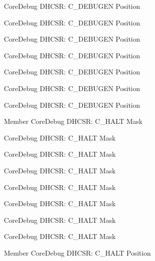 \begin{DoxyRefList}
\label{deprecated__deprecated000592}%
%
Core\+Debug DHCSR\+: C\+\_\+\+DEBUGEN Position 

\label{deprecated__deprecated000127}%
%
Core\+Debug DHCSR\+: C\+\_\+\+DEBUGEN Position 

\label{deprecated__deprecated000490}%
%
Core\+Debug DHCSR\+: C\+\_\+\+DEBUGEN Position 

\label{deprecated__deprecated000039}%
%
Core\+Debug DHCSR\+: C\+\_\+\+DEBUGEN Position 

\label{deprecated__deprecated000183}%
%
Core\+Debug DHCSR\+: C\+\_\+\+DEBUGEN Position 

\label{deprecated__deprecated000266}%
%
Core\+Debug DHCSR\+: C\+\_\+\+DEBUGEN Position 

\label{deprecated__deprecated000401}%
%
Core\+Debug DHCSR\+: C\+\_\+\+DEBUGEN Position  
\item[Member \doxylink{group__CMSIS__CoreDebug_ga1d905a3aa594eb2e8bb78bcc4da05b3f}{Core\+Debug\+\_\+\+DHCSR\+\_\+\+C\+\_\+\+HALT\+\_\+\+Msk} ]\label{deprecated__deprecated000265}%
%
Core\+Debug DHCSR\+: C\+\_\+\+HALT Mask 

\label{deprecated__deprecated000400}%
%
Core\+Debug DHCSR\+: C\+\_\+\+HALT Mask 

\label{deprecated__deprecated000324}%
%
Core\+Debug DHCSR\+: C\+\_\+\+HALT Mask 

\label{deprecated__deprecated000489}%
%
Core\+Debug DHCSR\+: C\+\_\+\+HALT Mask 

\label{deprecated__deprecated000182}%
%
Core\+Debug DHCSR\+: C\+\_\+\+HALT Mask 

\label{deprecated__deprecated000126}%
%
Core\+Debug DHCSR\+: C\+\_\+\+HALT Mask 

\label{deprecated__deprecated000038}%
%
Core\+Debug DHCSR\+: C\+\_\+\+HALT Mask 

\label{deprecated__deprecated000591}%
%
Core\+Debug DHCSR\+: C\+\_\+\+HALT Mask  
\item[Member \doxylink{group__CMSIS__CoreDebug_gaddf1d43f8857e4efc3dc4e6b15509692}{Core\+Debug\+\_\+\+DHCSR\+\_\+\+C\+\_\+\+HALT\+\_\+\+Pos} ]\label{deprecated__deprecated000181}%
%
Core\+Debug DHCSR\+: C\+\_\+\+HALT Position 


\end{DoxyRefList}
